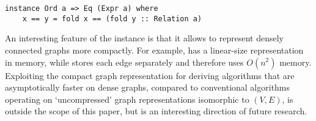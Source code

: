 \begin{verbatim}
instance Ord a => Eq (Expr a) where
    x == y = fold x == (fold y :: Relation a)
\end{verbatim}

An interesting feature of the  instance is that it allows to represent
densely connected graphs more compactly. For example, 
has a linear-size representation in memory, while 
stores each edge separately and therefore uses $O(n^2)$ memory. Exploiting the
compact graph representation for deriving algorithms that are asymptotically faster
on dense graphs, compared to conventional algorithms operating on `uncompressed'
graph representations isomorphic to $(V,E)$, is outside the scope of this paper,
but is an interesting direction of future research.
